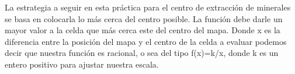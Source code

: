 La estrategia a seguir en esta práctica para el centro de extracción de minerales se basa en colocarla lo más cerca del centro posible. La función debe darle un mayor valor a la celda que más cerca este del centro del mapa. Donde x es la diferencia entre la posición del mapa y el centro de la celda a evaluar podemos decir que nuestra función es racional, o sea del tipo f(x)=k/x, donde k es un entero positivo para ajustar nuestra escala.

